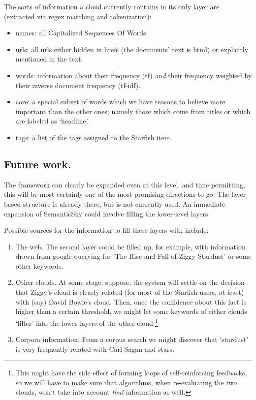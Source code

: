 \documentclass[11pt]{article}
\begin{document}
The sorts of information a cloud currently contains in its only layer are (extracted via regex matching and tokenization):
\begin{itemize}
\item names: all Capitalized Sequences Of Words.
\item urls: all urls either hidden in hrefs (the documents' text is html) or explicitly mentioned in the text.
\item words: information about their frequency (tf) \emph{and} their frequency weighted by their inverse document frequency (tf-idf).
\item core: a special subset of words which we have reasons to believe more important than the other ones; namely those which come from titles or which are labeled as `headline'.
\item tags: a list of the tags assigned to the Starfish item.
\end{itemize}


\subsection{Future work.}

The framework can clearly be expanded even at this level, and time permitting, this will be most certainly one of the most promising directions to go. The layer-based structure is already there, but is not currently used. An immediate expansion of SemanticSky could involve filling the lower-level layers.

Possible sources for the information to fill these layers with include:

\begin{enumerate}
\item The web. The second layer could be filled up, for example, with information drawn from google querying for 'The Rise and Fall of Ziggy Stardust' or some other keywords.
\item Other clouds. At some stage, suppose, the system will settle on the decision that Ziggy's cloud is clearly related (for most of the Starfish users, at least) with (say) David Bowie's cloud. Then, once the confidence about this fact is higher than a certain threshold, we might let some keywords of either clouds `filter' into the lower layers of the other cloud.\footnote{This might have the side effect of forming loops of self-reinforcing feedbacks, so we will have to make sure that algorithms, when re-evaluating the two clouds, won't take into account \emph{that} information as well.}
\item Corpora information. From a corpus search we might discover that `stardust' is very frequently related with Carl Sagan and stars.
\end{enumerate}
\end{document}
